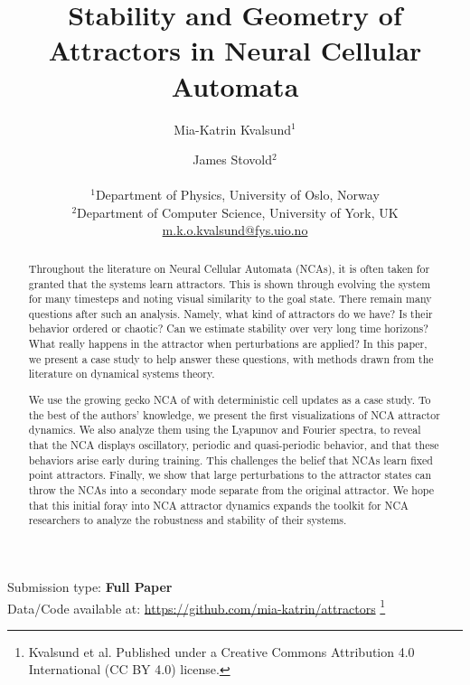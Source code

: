 \documentclass[letterpaper]{article}
\title{Stability and Geometry of Attractors in Neural Cellular Automata}
\author{
    Mia-Katrin Kvalsund$^{1}$
    \and
    James Stovold$^2$ \\
    \mbox{}\\
    $^1$Department of Physics, University of Oslo, Norway \\
    $^2$Department of Computer Science, University of York, UK \\
    \url{m.k.o.kvalsund@fys.uio.no}
} %
\newcommand\blfootnote[1]{%
  \begingroup
  \renewcommand\thefootnote{}\footnote{#1}%
  \addtocounter{footnote}{-1}%
  \endgroup
}
\begin{document}
\maketitle

\begin{abstract}
\vspace{-0.5em}
    Throughout the literature on Neural Cellular Automata (NCAs), it is often taken for granted that the systems learn attractors. This is shown through evolving the system for many timesteps and noting visual similarity to the goal state. There remain many questions after such an analysis. Namely, what kind of attractors do we have? Is their behavior ordered or chaotic? Can we estimate stability over very long time horizons? What really happens in the attractor when perturbations are applied? In this paper, we present a case study to help answer these questions, with methods drawn from the literature on dynamical systems theory. 
    
    We use the growing gecko NCA of \cite{mordvintsev2020growing} with deterministic cell updates as a case study. To the best of the authors' knowledge, we present the first visualizations of NCA attractor dynamics. We also analyze them using the Lyapunov and Fourier spectra, to reveal that the NCA displays oscillatory, periodic and quasi-periodic behavior, and that these behaviors arise early during training. This challenges the belief that NCAs learn fixed point attractors. Finally, we show that large perturbations to the attractor states can throw the NCAs into a secondary mode separate from the original attractor. We hope that this initial foray into NCA attractor dynamics expands the toolkit for NCA researchers to analyze the robustness and stability of their systems. 
\end{abstract}


\vspace{-0.5em}
\noindent{}Submission type: \textbf{Full Paper}\\
\noindent{}Data/Code available at: \url{https://github.com/mia-katrin/attractors}
\blfootnote{ Kvalsund et al. Published under a Creative Commons Attribution 4.0 International (CC BY 4.0) license.}
\end{document}
